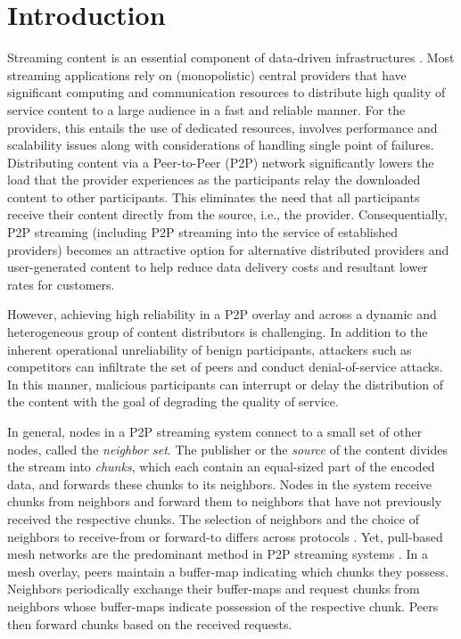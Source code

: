 \section{Introduction}
\label{sec:intro}

Streaming content is an essential component of data-driven infrastructures \cite{emule}.
Most streaming applications rely on (monopolistic) central providers that have significant computing and communication resources to distribute high quality of service content to a large audience in a fast and reliable manner. For the providers, this entails the use of dedicated resources, involves performance and scalability issues along with considerations of handling single point of failures.
Distributing content via a Peer-to-Peer (P2P) network significantly lowers the load that the provider experiences as the participants relay the downloaded content to other participants. This eliminates the need that all participants receive their content directly from the source, i.e., the provider. 
Consequentially, P2P streaming (including P2P streaming into the service of established providers) becomes an attractive option for alternative distributed providers and user-generated content to help reduce data delivery costs and resultant lower rates for customers.


However, achieving high reliability in a P2P overlay and across a dynamic and heterogeneous group of content distributors is challenging. In addition to the inherent operational unreliability of benign participants, attackers such as competitors can infiltrate the set of peers and conduct denial-of-service attacks. In this manner, malicious participants can interrupt or delay the distribution of the content with the goal of degrading the quality of service. 

In general, nodes in a P2P streaming system connect to a small set of other nodes, called the \emph{neighbor set}. 
The publisher or the \emph{source} of the content divides the stream into \emph{chunks}, which each contain an equal-sized part of the encoded data, and forwards these chunks to its neighbors. Nodes in the system receive chunks from neighbors and forward them to neighbors that have not previously received the respective chunks. 
The selection of neighbors and the choice of neighbors to receive-from or forward-to differs across protocols \cite{sasi2014survey}.  Yet, pull-based mesh networks are the predominant method in P2P streaming systems \cite{zhang2014modeling}. In a mesh overlay, peers maintain a buffer-map indicating which chunks they possess.  Neighbors periodically exchange their buffer-maps and request chunks from neighbors whose buffer-maps indicate possession of the respective chunk. Peers then forward chunks based on the received requests. 


